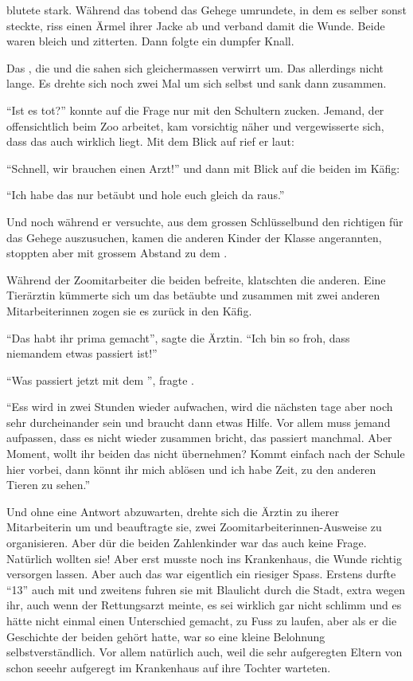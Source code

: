  blutete stark. Während das  tobend das Gehege umrundete, in dem es selber sonst steckte, riss  einen Ärmel ihrer Jacke ab und verband damit die Wunde. Beide waren bleich und zitterten. Dann folgte ein dumpfer Knall.

Das , die  und die  sahen sich gleichermassen verwirrt um. Das  allerdings nicht lange. Es drehte sich noch zwei Mal um sich selbst und sank dann zusammen.

\enquote{Ist es tot?}  konnte auf die Frage nur mit den Schultern zucken. Jemand, der offensichtlich beim Zoo arbeitet, kam vorsichtig näher und vergewisserte sich, dass das  auch wirklich liegt. Mit dem Blick auf  rief er laut:

\enquote{Schnell, wir brauchen einen Arzt!} und dann mit Blick auf die beiden im Käfig:

\enquote{Ich habe das  nur betäubt und hole euch gleich da raus.}

Und noch während er versuchte, aus dem grossen Schlüsselbund den richtigen für das Gehege auszusuchen, kamen die anderen Kinder der Klasse angerannten, stoppten aber mit grossem Abstand zu dem .
  
Während der Zoomitarbeiter die beiden befreite, klatschten die anderen. Eine Tierärztin kümmerte sich um das betäubte  und zusammen mit zwei anderen Mitarbeiterinnen zogen sie es zurück in den Käfig. 

\enquote{Das habt ihr prima gemacht}, sagte die Ärztin. \enquote{Ich bin so froh, dass niemandem etwas passiert ist!}

\enquote{Was passiert jetzt mit dem }, fragte . 

\enquote{Ess wird in zwei Stunden wieder aufwachen, wird die nächsten tage aber noch sehr durcheinander sein und braucht dann etwas Hilfe. Vor allem muss jemand aufpassen, dass es nicht wieder zusammen bricht, das passiert manchmal. Aber Moment, wollt ihr beiden das nicht übernehmen? Kommt einfach nach der Schule hier vorbei, dann könnt ihr mich ablösen und ich habe Zeit, zu den anderen Tieren zu sehen.} 

Und ohne eine Antwort abzuwarten, drehte sich die Ärztin zu iherer Mitarbeiterin um und beauftragte sie, zwei Zoomitarbeiterinnen-Ausweise zu organisieren. Aber dür die beiden Zahlenkinder war das auch keine Frage. Natürlich wollten sie! Aber erst musste  noch ins Krankenhaus, die Wunde richtig versorgen lassen. Aber auch das war eigentlich ein riesiger Spass. Erstens durfte \enquote{13} auch mit und zweitens fuhren sie mit Blaulicht durch die Stadt, extra wegen ihr, auch wenn der Rettungsarzt meinte, es sei wirklich gar nicht schlimm und es hätte nicht einmal einen Unterschied gemacht, zu Fuss zu laufen, aber als er die Geschichte der beiden gehört hatte, war so eine kleine Belohnung selbstverständlich. Vor allem natürlich auch, weil die sehr aufgeregten Eltern von  schon seeehr aufgeregt im Krankenhaus auf ihre Tochter warteten.
